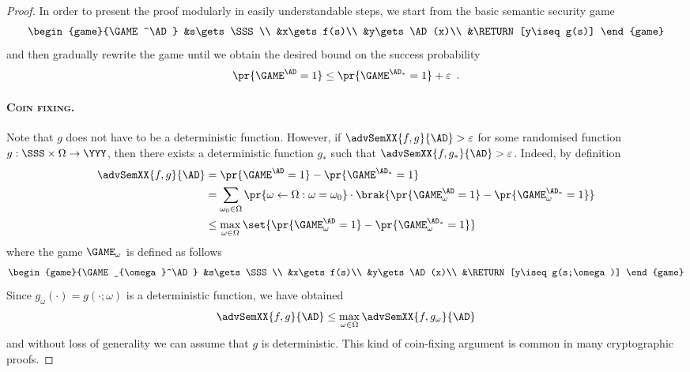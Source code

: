 \documentclass{llncs}
\begin{document}
\begin{proof}
In order to present the proof modularly in easily understandable
steps, we start from the basic semantic security game
\begin{align*}
  \begin{game}{\GAME^\AD}
    &s\gets\SSS\\
    &x\gets f(s)\\
    &y\gets\AD(x)\\
    &\RETURN [y\iseq g(s)]
  \end{game}
\end{align*}
and then gradually rewrite the game until we obtain the desired bound
on the success probability 
\begin{align*}
\pr{\GAME^\AD=1}\leq\pr{\smash{\GAME^{\AD_*}=1}}+\varepsilon\enspace.  
\end{align*}

\paragraph{\textsc{Coin fixing}.} Note that $g$ does not have to be a
deterministic function. However, if $\advSemXX{f,g}{\AD}>\varepsilon$
for some randomised function $g:\SSS\times\Omega\to\YYY$, then there
exists a deterministic function $g_*$ such that
$\advSemXX{f,g_*}{\AD}>\varepsilon$. Indeed,  by definition
\begin{align*}
  \advSemXX{f,g}{\AD}%
  &=\pr{\GAME^{\AD}=1}-\pr{\smash{\GAME^{\AD_*}=1}}\\
  &=\sum_{\omega_0\in\Omega}\pr{\omega\gets\Omega:\omega=\omega_0}
  \cdot\brak{\pr{\GAME_{\omega}^\AD=1}-\pr{\smash{\GAME_{\omega}^{\AD_*}=1}}}\\
  &\leq\max_{\omega\in\Omega}\set{\pr{\GAME_{\omega}^\AD=1}-\pr{\smash{\GAME_{\omega}^{\AD_*}=1}}}
\end{align*}
where the game $\GAME_{\omega}$ is defined as follows
\begin{align*}
  \begin{game}{\GAME_{\omega}^\AD}
    &s\gets\SSS\\
    &x\gets f(s)\\
    &y\gets\AD(x)\\
    &\RETURN [y\iseq g(s;\omega)]
  \end{game}
\end{align*}
Since $g_\omega(\cdot)=g(\cdot;\omega)$ is a deterministic function, we have obtained
\begin{align*}
  \advSemXX{f,g}{\AD}\leq\max_{\omega\in\Omega}\advSemXX{f,g_\omega}{\AD}
\end{align*}
and without loss of generality we can assume that $g$ is
deterministic.  This kind of coin-fixing argument is common in many
cryptographic proofs.


\end{proof}
\end{document}
